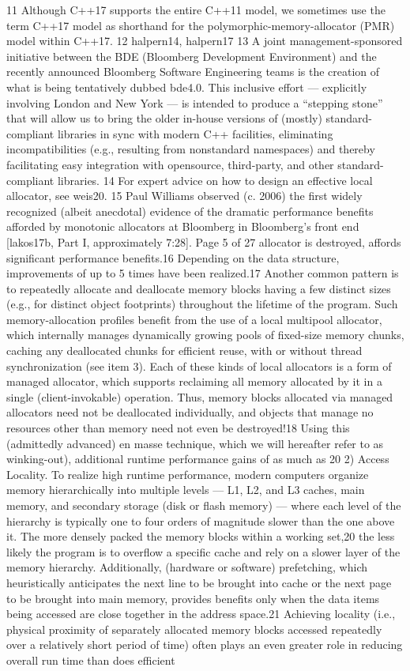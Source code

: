 11 Although C++17 supports the entire C++11 model, we sometimes use the term C++17 model as
shorthand for the polymorphic-memory-allocator (PMR) model within C++17.
12 halpern14, halpern17
13 A joint management-sponsored initiative between the BDE (Bloomberg Development Environment)
and the recently announced Bloomberg Software Engineering teams is the creation of what is being
tentatively dubbed bde4.0. This inclusive effort — explicitly involving London and New York — is
intended to produce a “stepping stone” that will allow us to bring the older in-house versions of
(mostly) standard-compliant libraries in sync with modern C++ facilities, eliminating incompatibilities
(e.g., resulting from nonstandard namespaces) and thereby facilitating easy integration with opensource, third-party, and other standard-compliant libraries. 14 For expert advice on how to design an effective local allocator, see weis20. 15 Paul Williams observed (c. 2006) the first widely recognized (albeit anecdotal) evidence of the
dramatic performance benefits afforded by monotonic allocators at Bloomberg in Bloomberg’s front
end [lakos17b, Part I, approximately 7:28].
Page 5 of 27
allocator is destroyed, affords significant performance benefits.16 Depending
on the data structure, improvements of up to 5 times have been realized.17
Another common pattern is to repeatedly allocate and deallocate memory
blocks having a few distinct sizes (e.g., for distinct object footprints)
throughout the lifetime of the program. Such memory-allocation profiles
benefit from the use of a local multipool allocator, which internally manages
dynamically growing pools of fixed-size memory chunks, caching any
deallocated chunks for efficient reuse, with or without thread synchronization
(see item 3).
Each of these kinds of local allocators is a form of managed allocator, which
supports reclaiming all memory allocated by it in a single (client-invokable)
operation. Thus, memory blocks allocated via managed allocators need not be
deallocated individually, and objects that manage no resources other than
memory need not even be destroyed!18 Using this (admittedly advanced) en
masse technique, which we will hereafter refer to as winking-out), additional
runtime performance gains of as much as 20%
2) Access Locality. To realize high runtime performance, modern computers
organize memory hierarchically into multiple levels — L1, L2, and L3 caches,
main memory, and secondary storage (disk or flash memory) — where each
level of the hierarchy is typically one to four orders of magnitude slower than
the one above it. The more densely packed the memory blocks within a
working set,20 the less likely the program is to overflow a specific cache and
rely on a slower layer of the memory hierarchy. Additionally, (hardware or
software) prefetching, which heuristically anticipates the next line to be
brought into cache or the next page to be brought into main memory, provides
benefits only when the data items being accessed are close together in the
address space.21
Achieving locality (i.e., physical proximity of separately allocated memory
blocks accessed repeatedly over a relatively short period of time) often plays
an even greater role in reducing overall run time than does efficient

